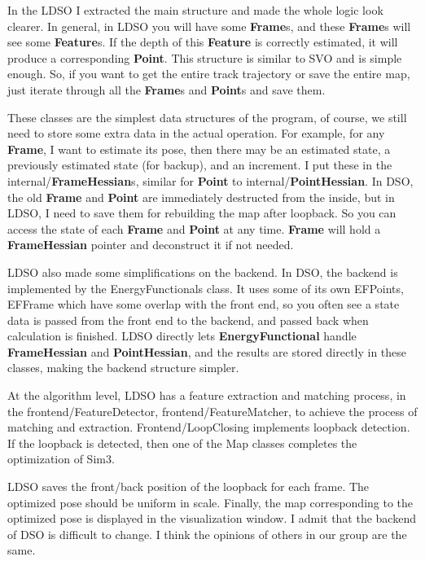 \documentclass[a4paper,10pt]{article}
\begin{document}
	In the LDSO I extracted the main structure and made the whole logic look clearer. In general, in LDSO you will have some \textbf{Frame}s, and these \textbf{Frame}s will see some \textbf{Feature}s. If the depth of this \textbf{Feature} is correctly estimated, it will produce a corresponding \textbf{Point}. This structure is similar to SVO and is simple enough. So, if you want to get the entire track trajectory or save the entire map, just iterate through all the \textbf{Frame}s and \textbf{Point}s and save them.
	
	These classes are the simplest data structures of the program, of course, we still need to store some extra data in the actual operation. For example, for any \textbf{Frame}, I want to estimate its pose, then there may be an estimated state, a previously estimated state (for backup), and an increment. I put these in the internal/\textbf{FrameHessian}s, similar for \textbf{Point} to internal/\textbf{PointHessian}. In DSO, the old \textbf{Frame} and \textbf{Point} are immediately destructed from the inside, but in LDSO, I need to save them for rebuilding the map after loopback. So you can access the state of each \textbf{Frame} and \textbf{Point} at any time. \textbf{Frame} will hold a \textbf{FrameHessian} pointer and deconstruct it if not needed.
	
	LDSO also made some simplifications on the backend. In DSO, the backend is implemented by the EnergyFunctionals class. It uses some of its own EFPoints, EFFrame which have some overlap with the front end, so you often see a state data is passed from the front end to the backend, and passed back when calculation is finished. LDSO directly lets \textbf{EnergyFunctional} handle \textbf{FrameHessian} and \textbf{PointHessian}, and the results are stored directly in these classes, making the backend structure simpler.
	
	At the algorithm level, LDSO has a feature extraction and matching process, in the frontend/FeatureDetector, frontend/FeatureMatcher, to achieve the process of matching and extraction. Frontend/LoopClosing implements loopback detection. If the loopback is detected, then one of the Map classes completes the optimization of Sim3.
	
	LDSO saves the front/back position of the loopback for each frame. The optimized pose should be uniform in scale. Finally, the map corresponding to the optimized pose is displayed in the visualization window. I admit that the backend of DSO is difficult to change. I think the opinions of others in our group are the same.
	
\end{document}
